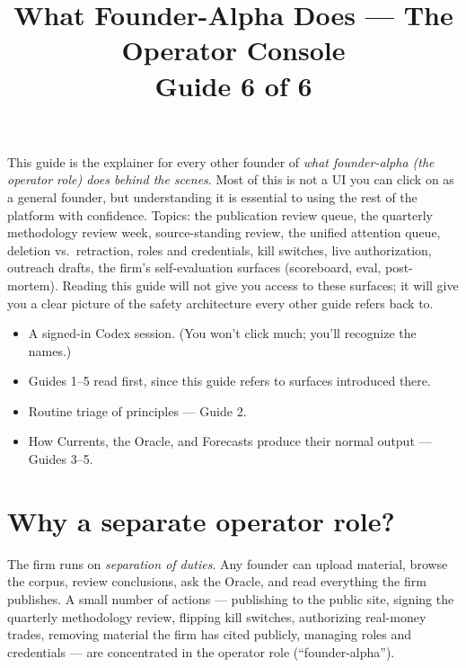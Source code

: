 \documentclass[11pt]{article}
\title{\sffamily\bfseries What Founder-Alpha Does --- The Operator Console\\[2pt]\large Guide 6 of 6}
\date{}
\author{}
\begin{document}
\maketitle
\thispagestyle{empty}

\begin{tldr}
This guide is the explainer for every other founder of \emph{what
founder-alpha (the operator role) does behind the scenes}. Most of
this is not a UI you can click on as a general founder, but
understanding it is essential to using the rest of the platform with
confidence. Topics: the publication review queue, the quarterly
methodology review week, source-standing review, the unified attention
queue, deletion vs.\ retraction, roles and credentials, kill switches,
live authorization, outreach drafts, the firm's self-evaluation
surfaces (scoreboard, eval, post-mortem). Reading this guide will not
give you access to these surfaces; it will give you a clear picture of
the safety architecture every other guide refers back to.
\end{tldr}

\begin{youwillneed}
\begin{itemize}[leftmargin=*,itemsep=0.2em,topsep=0.2em]
  \item A signed-in Codex session. (You won't click much; you'll
        recognize the names.)
  \item Guides 1--5 read first, since this guide refers to surfaces
        introduced there.
\end{itemize}
\end{youwillneed}

\begin{notcovered}
\begin{itemize}[leftmargin=*,itemsep=0.2em,topsep=0.2em]
  \item Routine triage of principles --- Guide 2.
  \item How Currents, the Oracle, and Forecasts produce their normal
        output --- Guides 3--5.
\end{itemize}
\end{notcovered}

\section{Why a separate operator role?}

The firm runs on \emph{separation of duties}. Any founder can upload
material, browse the corpus, review conclusions, ask the Oracle, and
read everything the firm publishes. A small number of actions ---
publishing to the public site, signing the quarterly methodology
review, flipping kill switches, authorizing real-money trades,
removing material the firm has cited publicly, managing roles and
credentials --- are concentrated in the operator role
(``founder-alpha'').
\end{document}
